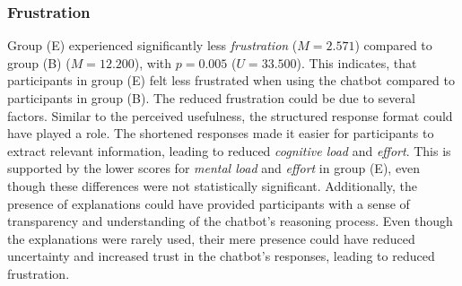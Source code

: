 
\subsubsection{Frustration} \label{sssec:frustration}

Group (E) experienced significantly less \textit{frustration} ($M=2.571$) compared to group (B) ($M=12.200$), with $p=0.005$ ($U=33.500$). This indicates, that participants in group (E) felt less frustrated when using the chatbot compared to participants in group (B). The reduced frustration could be due to several factors. Similar to the perceived usefulness, the structured response format could have played a role. The shortened responses made it easier for participants to extract relevant information, leading to reduced \textit{cognitive load} and \textit{effort}. This is supported by the lower scores for \textit{mental load} and \textit{effort} in group (E), even though these differences were not statistically significant. Additionally, the presence of explanations could have provided participants with a sense of transparency and understanding of the chatbot's reasoning process. Even though the explanations were rarely used, their mere presence could have reduced uncertainty and increased trust in the chatbot's responses, leading to reduced frustration.

